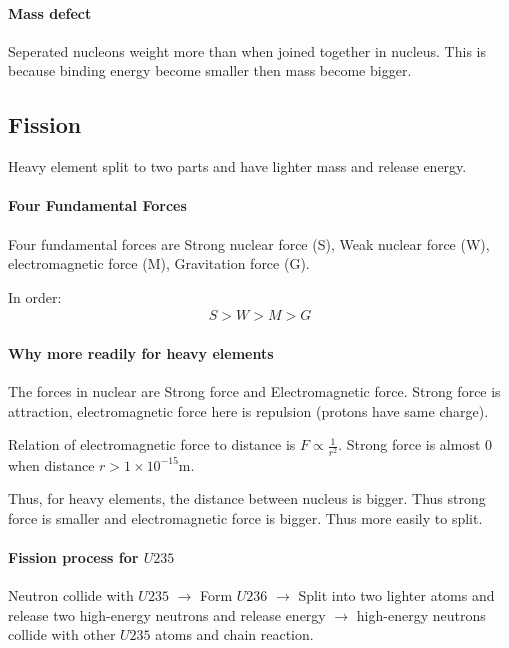         \paragraph{Mass defect}
            Seperated nucleons weight more than when joined together in nucleus. This is because binding energy become smaller then mass become bigger.
    
    \subsection{Fission}
        Heavy element split to two parts and have lighter mass and release energy.

        \paragraph{Four Fundamental Forces}
            Four fundamental forces are Strong nuclear force (S), Weak nuclear force (W), electromagnetic force (M), Gravitation force (G).
            
            In order:
            \begin{align}
                S > W > M > G
            \end{align}

        \paragraph{Why more readily for heavy elements}
            The forces in nuclear are Strong force and Electromagnetic force. Strong force is attraction, electromagnetic force here is repulsion (protons have same charge).

            Relation of electromagnetic force to distance is $F \propto \frac{1}{r^2}$. Strong force is almost 0 when distance $r > 1 \times 10^{-15} \mathrm{m}$.

            Thus, for heavy elements, the distance between nucleus is bigger. Thus strong force is smaller and electromagnetic force is bigger. Thus more easily to split.

        \paragraph{Fission process for $U235$}
            Neutron collide with $U235$ $\to$ Form $U236$ $\to$ Split into two lighter atoms and release two high-energy neutrons and release energy $\to$ high-energy neutrons collide with other $U235$ atoms and chain reaction.

